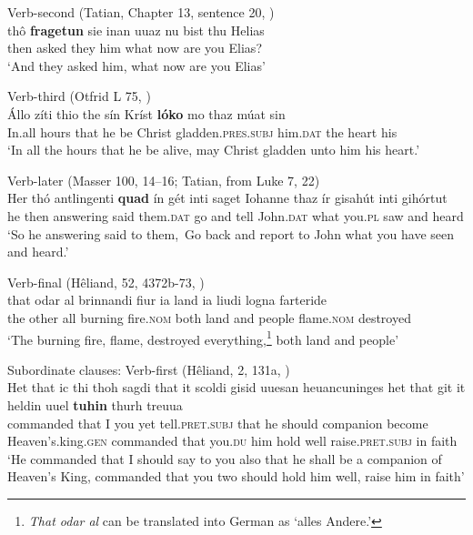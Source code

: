 \ex Verb-second (Tatian, Chapter 13, sentence 20, \citealt{Sievers1961})\\
\gll thô   \textbf{fragetun}  sie     inan      uuaz   nu    bist   thu     Helias\\
then   asked     they    him      what   now  are   you     Elias?\\
\glt ‘And they asked him, what now are you Elias’

\ex Verb-third (Otfrid L 75, \citealt{Erdmann1973})\\
\gll Állo zíti    thio the  sín   Kríst    \textbf{lóko}          mo       thaz múat sin\\
In.all hours   that he  be  Christ    gladden.\textsc{pres.subj}  him.\textsc{dat}    the heart his\\
\glt ‘In all the hours that he be alive, may Christ gladden unto him his heart.’

\ex Verb-later (Masser 100, 14--16; Tatian, from Luke 7, 22)\\
\gll Her   thó      antlingenti    \textbf{quad}  ín       gét   inti  saget   Iohanne    thaz  ír   gisahút   inti    gihórtut\\
he  then  answering  said   them.\textsc{dat}  go  and  tell    John.\textsc{dat}  what        you.\textsc{pl}  saw    and    heard\\
\glt ‘So he answering said to them,~Go back and report to John what you have seen and heard.’ 

\ex Verb-final (Hêliand, 52, 4372b-73, \citealt{Sievers1935})\\
\gll that  odar   al  brinnandi  fiur       ia    land  ia   liudi     logna farteride\\
the   other  all   burning     fire.\textsc{nom}  both   land   and   people  flame\textsc{{}.nom} destroyed\\   
\glt ‘The burning fire, flame, destroyed everything,\footnote{{\emph{That odar al} can be translated into German as ‘alles Andere.’}}  both land and people’
\z
\z

\ea%
    \label{ex:2:2}Subordinate clauses:
\ea Verb-first (Hêliand, 2, 131a, \citealt{Sievers1935})\\
\gll Het      that   ic   thi   thoh  sagdi      that    it    scoldi  gisid uuesan  heuancuninges    het        that    git      it    heldin   uuel \textbf{tuhin}{}   thurh  treuua\\
commanded   that   I  you   yet     tell.\textsc{pret.subj}   that    he   should   companion become   Heaven’s.king.\textsc{gen}  commanded   that    you.\textsc{du}    him  hold  well raise.\textsc{pret.subj}       in     faith\\
\glt ‘He commanded that I should say to you also that he shall be a companion of Heaven's King, commanded that you two should hold him well, raise him in faith’

